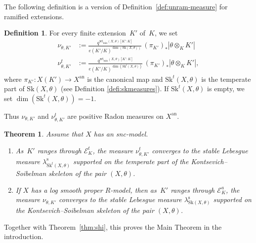 \documentclass[11pt]{article}
\let\mathcal\mathscr
\newtheorem{theorem}[equation]{Theorem}
\theoremstyle{definition}
\newtheorem{definition}[equation]{Definition}
\numberwithin{equation}{subsection}
\newcommand{\snc}{\textit{snc}}
\newcommand{\an}{\mathrm{an}}
\newcommand{\Sk}{\mathrm{Sk}}
\newcommand{\rs}{\mathrm{s}}
\newcommand{\wt}{\mathrm{wt}}
\let\form\theta
\let\Leb\lambda
\begin{document}
The following definition is a version of Definition~\ref{def:unram-measure} for ramified extensions.
\begin{definition}\label{def:ram-measure}
For every finite extension~$K'$ of~$K$, we set\enlargethispage{.5\baselineskip}%
\begin{align*}
\nu_{\form,K'}&:=\frac{q^{\wt_{\min}(X,\form)[K' \colon K]}}{e(K'/K)^{\dim(\Sk(X,\form))}}\,
(\pi_{K'})_*|\form\otimes_K K'|\\
\tag*{and}
\nu^t_{\form,K'}&:=\frac{q^{\wt_{\min}(X,\form)[K' \colon K]}}{e(K'/K)^{\dim(\Sk^t(X,\form))}}\,
(\pi_{K'})_*|\form\otimes_K K'|,
\end{align*}
where $\pi_{K'}\colon X(K')\to X^{\an}$ is the canonical map and $\Sk^t(X,\form)$ is the temperate part of $\Sk(X,\form)$ (see Definition \ref{defi:skmeasures}). If $\Sk^t(X,\form)$ is empty, we set $\dim(\Sk^t(X,\form))=-1$.
\end{definition}
Thus $\nu_{\form,K'}$ and $\nu^t_{\form,K'}$ are positive Radon measures on $X^{\an}$.

\begin{theorem}\label{thm:padic}
Assume that $X$ has an \snc-model.
\begin{enumerate}
\item \label{it:maintame} As~$K'$ ranges through $\mathcal{E}^t_K$, the measure $\nu^t_{\form,K'}$
converges to the stable Lebesgue measure $\Leb^{\rs}_{\Sk^t(X,\form)}$
supported on the temperate part of the Kontsevich--Soibelman skeleton of the pair $(X,\form)$.
\item \label{it:mainwild} If $X$ has a log smooth proper $R$\nobreakdash-model, then as~$K'$ ranges through $\mathcal{E}^a_K$, the measure $\nu_{\form,K'}$
converges to the stable Lebesgue measure $\Leb^{\rs}_{\Sk(X,\form)}$
supported on the Kontsevich--Soibelman skeleton of the pair $(X,\form)$.
\end{enumerate}
\end{theorem}
Together with Theorem~\ref{thm:shi}, this proves the Main Theorem in the introduction.
\end{document}
